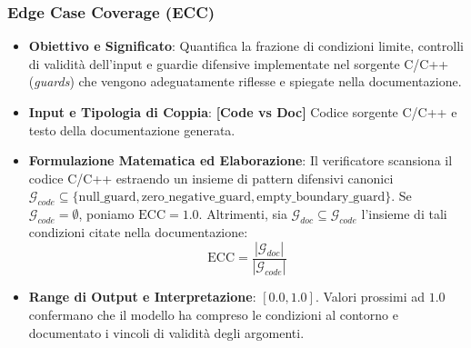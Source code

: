 \subsubsection{Edge Case Coverage (ECC)}
\label{subsubsec:ecc}
\begin{itemize}[leftmargin=*, label=\textbullet]
    \item \textbf{Obiettivo e Significato}: Quantifica la frazione di condizioni limite, controlli di validità dell'input e guardie difensive implementate nel sorgente C/C++ (\emph{guards}) che vengono adeguatamente riflesse e spiegate nella documentazione.
    \item \textbf{Input e Tipologia di Coppia}: \textbf{[Code vs Doc]} Codice sorgente C/C++ e testo della documentazione generata.
    \item \textbf{Formulazione Matematica ed Elaborazione}: Il verificatore scansiona il codice C/C++ estraendo un insieme di pattern difensivi canonici $\mathcal{G}_{code} \subseteq \{\text{null\_guard}, \text{zero\_negative\_guard}, \text{empty\_boundary\_guard}\}$. Se $\mathcal{G}_{code} = \emptyset$, poniamo $\text{ECC} = 1.0$. Altrimenti, sia $\mathcal{G}_{doc} \subseteq \mathcal{G}_{code}$ l'insieme di tali condizioni citate nella documentazione:
    \begin{equation}
        \text{ECC} = \frac{|\mathcal{G}_{doc}|}{|\mathcal{G}_{code}|}
        \label{eq:ecc_formula}
    \end{equation}
    \item \textbf{Range di Output e Interpretazione}: $[0.0, 1.0]$. Valori prossimi ad $1.0$ confermano che il modello ha compreso le condizioni al contorno e documentato i vincoli di validità degli argomenti.
\end{itemize}

